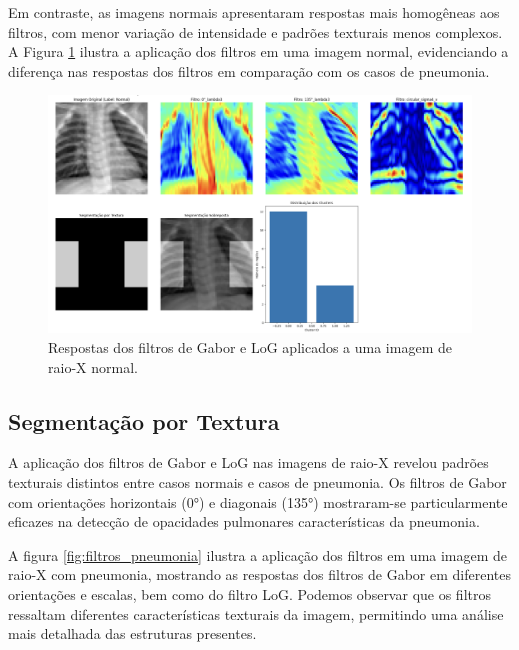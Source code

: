 \documentclass[sigconf,nonacm]{acmart}
\begin{document}
Em contraste, as imagens normais apresentaram respostas mais homogêneas aos filtros, com menor variação de intensidade e padrões texturais menos complexos. A Figura \ref{fig:filtros_normal} ilustra a aplicação dos filtros em uma imagem normal, evidenciando a diferença nas respostas dos filtros em comparação com os casos de pneumonia.

\begin{figure}[h]
  \centering
  \includegraphics[width=1\linewidth]{../images/filtros_normal.png}
  \caption{Respostas dos filtros de Gabor e LoG aplicados a uma imagem de raio-X normal.}
  \label{fig:filtros_normal}
\end{figure}

\subsection{Segmentação por Textura}
A aplicação dos filtros de Gabor e LoG nas imagens de raio-X revelou padrões texturais distintos entre casos normais e casos de pneumonia. Os filtros de Gabor com orientações horizontais (0°) e diagonais (135°) mostraram-se particularmente eficazes na detecção de opacidades pulmonares características da pneumonia.

A figura \ref{fig:filtros_pneumonia} ilustra a aplicação dos filtros em uma imagem de raio-X com pneumonia, mostrando as respostas dos filtros de Gabor em diferentes orientações e escalas, bem como do filtro LoG. Podemos observar que os filtros ressaltam diferentes características texturais da imagem, permitindo uma análise mais detalhada das estruturas presentes.
\end{document}
